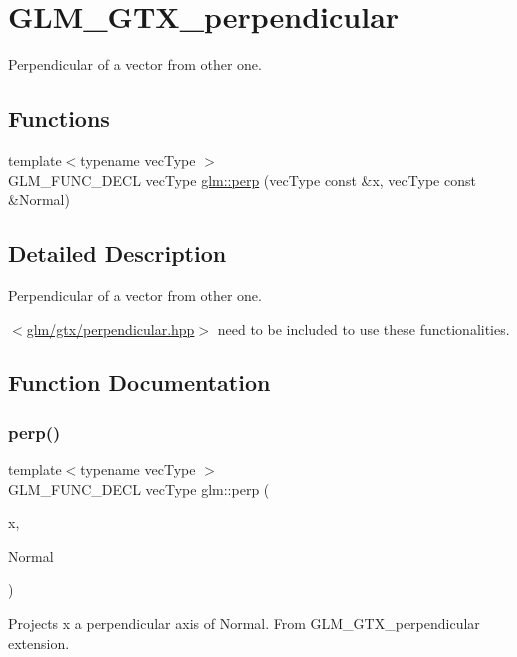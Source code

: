 \hypertarget{group__gtx__perpendicular}{}\section{G\+L\+M\+\_\+\+G\+T\+X\+\_\+perpendicular}
\label{group__gtx__perpendicular}


Perpendicular of a vector from other one.  


\subsection*{Functions}
\begin{DoxyCompactItemize}
\item 
{\footnotesize template$<$typename vec\+Type $>$ }\\G\+L\+M\+\_\+\+F\+U\+N\+C\+\_\+\+D\+E\+CL vec\+Type \hyperlink{group__gtx__perpendicular_ga41f8c73da9798a18e6b1e32f1e301f07}{glm\+::perp} (vec\+Type const \&x, vec\+Type const \&Normal)
\end{DoxyCompactItemize}


\subsection{Detailed Description}
Perpendicular of a vector from other one. 

$<$\hyperlink{perpendicular_8hpp}{glm/gtx/perpendicular.\+hpp}$>$ need to be included to use these functionalities. 

\subsection{Function Documentation}
\mbox{\label{group__gtx__perpendicular_ga41f8c73da9798a18e6b1e32f1e301f07}} 
\subsubsection{\texorpdfstring{perp()}{perp()}}
{\footnotesize\ttfamily template$<$typename vec\+Type $>$ \\
G\+L\+M\+\_\+\+F\+U\+N\+C\+\_\+\+D\+E\+CL vec\+Type glm\+::perp (\begin{DoxyParamCaption}\item[{vec\+Type const \&}]{x,  }\item[{vec\+Type const \&}]{Normal }\end{DoxyParamCaption})}

Projects x a perpendicular axis of Normal. From G\+L\+M\+\_\+\+G\+T\+X\+\_\+perpendicular extension. 